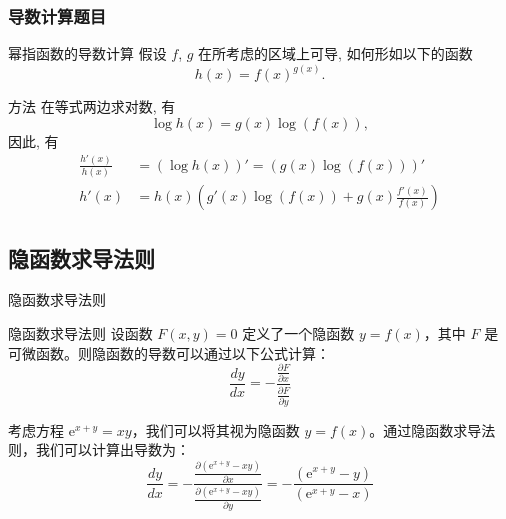 \documentclass[
10pt,
aspectratio=43,
]{beamer}
\begin{document}
\begin{frame}
	\frametitle{导数计算题目}
	\begin{block}{幂指函数的导数计算}
		假设 $f$, $g$ 在所考虑的区域上可导, 如何形如以下的函数
		\[
			h(x)=f(x)^{g(x)}.
		\]
	\end{block}

	\pause

	\begin{exampleblock}{方法}
		在等式两边求对数, 有
		\[
			\log h(x) = g(x)\log (f(x)),
		\]
		因此, 有
		\begin{align*}
			\displaystyle\frac{h'(x)}{h(x)} & =(\log h(x))' = (g(x)\log (f(x)))'                                     \\
			h'(x)                           & =\displaystyle h(x)\left(g'(x)\log(f(x))+g(x)\frac{f'(x)}{f(x)}\right)
		\end{align*}
	\end{exampleblock}
\end{frame}

\subsection{隐函数求导法则}
\begin{frame}{隐函数求导法则}
	\begin{block}{隐函数求导法则}
		设函数 $F(x, y) = 0$ 定义了一个隐函数 $y = f(x)$，其中 $F$ 是可微函数。则隐函数的导数可以通过以下公式计算：
		\[
			\displaystyle\frac{{dy}}{{dx}} = -\frac{{\frac{{\partial F}}{{\partial x}}}}{{\frac{{\partial F}}{{\partial y}}}}
		\]
	\end{block}

	\pause

	\begin{example}
		考虑方程 $\mathrm{e}^{x+y}=xy$，我们可以将其视为隐函数 $y = f(x)$。通过隐函数求导法则，我们可以计算出导数为：
		\[
			\displaystyle\frac{{dy}}{{dx}} = -\displaystyle\frac{{\displaystyle\frac{{\partial (\mathrm{e}^{x+y}-xy)}}{{\partial x}}}}{{\displaystyle\frac{{\partial (\mathrm{e}^{x+y}-xy)}}{{\partial y}}}} = -\frac{{(\mathrm{e}^{x+y}-y)}}{{(\mathrm{e}^{x+y}-x)}}
		\]
	\end{example}
\end{frame}
\end{document}
